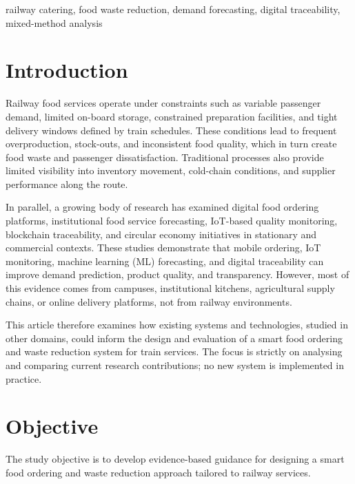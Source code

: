 \documentclass[conference]{IEEEtran}
\begin{document}
\begin{IEEEkeywords}
railway catering, food waste reduction, demand forecasting, digital traceability, mixed-method analysis
\end{IEEEkeywords}

\section{Introduction}

Railway food services operate under constraints such as variable passenger demand, limited on-board storage, constrained preparation facilities, and tight delivery windows defined by train schedules. These conditions lead to frequent overproduction, stock-outs, and inconsistent food quality, which in turn create food waste and passenger dissatisfaction. Traditional processes also provide limited visibility into inventory movement, cold-chain conditions, and supplier performance along the route.

In parallel, a growing body of research has examined digital food ordering platforms, institutional food service forecasting, IoT-based quality monitoring, blockchain traceability, and circular economy initiatives in stationary and commercial contexts. These studies demonstrate that mobile ordering, IoT monitoring, machine learning (ML) forecasting, and digital traceability can improve demand prediction, product quality, and transparency. However, most of this evidence comes from campuses, institutional kitchens, agricultural supply chains, or online delivery platforms, not from railway environments.

This article therefore examines how existing systems and technologies, studied in other domains, could inform the design and evaluation of a smart food ordering and waste reduction system for train services. The focus is strictly on analysing and comparing current research contributions; no new system is implemented in practice.

\section{Objective}

The study objective is to develop evidence-based guidance for designing a smart food ordering and waste reduction approach tailored to railway services.
\end{document}
